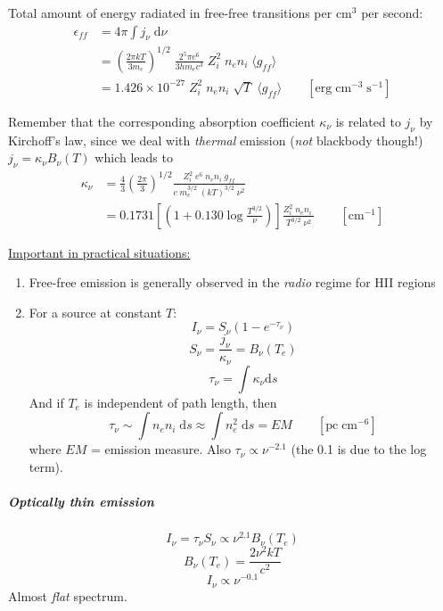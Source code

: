 \documentclass[11pt]{article}
\newcommand{\mar}[1]{\hspace{0pt}\marginpar{-\textcolor{black}{#1}-}}
\begin{document}
Total amount of energy radiated in free-free transitions per cm$^{3}$
per second:
\begin{align*}
    \epsilon_{ff} &= 4\pi \int{ j_{\nu} \;\mathrm{d}\nu }
    \\&= \left( \frac{2{\pi}kT}{3m_{e}} \right)^{1/2}\;
    \frac{2^{5} \pi e^{6}}{3hm_{e}c^{3}}\;
    Z_{i}^{2}\; n_{e}n_{i}\; \langle g_{ff} \rangle
    \\&= 1.426 \times 10^{-27}\; Z_{i}^{2}\; n_{e}n_{i}\; \sqrt{T}\;
    \langle g_{ff} \rangle
    \qquad \left[ \mathrm{erg}\; \mathrm{cm}^{-3}\; \mathrm{s}^{-1} \right]
\end{align*}

Remember that the corresponding absorption coefficient $\kappa_{\nu}$ is
related to $j_{\nu}$ by Kirchoff's law, since we deal with \emph{thermal}
emission (\emph{not} blackbody though!) $j_{\nu} = \kappa_{\nu}B_{\nu}(T)$
which leads to
\begin{align*}
    \kappa_{\nu} &= \frac{4}{3} \left( \frac{2\pi}{3} \right)^{1/2}
    \frac{ Z_{i}^{2}\; e^{6}\; n_{e}n_{i}\; g_{ff} }{ c\; m_{e}^{3/2}\; (kT)^{3/2}\; \nu^{2} }
    \\&= 0.1731 \left[ \left( 1 + 0.130 \log{\frac{T^{3/2}}{\nu}} \right) \right]
    \frac{ Z_{i}^{2}\; n_{e}n_{i}\; }{ T^{3/2}\; \nu^{2} }
    \qquad \left[ \mathrm{cm}^{-1} \right]
\end{align*}

\mar{65}\underline{Important in practical situations:}
\begin{enumerate}
    \item Free-free emission is generally observed in the \emph{radio} regime
        for HII regions
    \item For a source at constant $T$:
        \[
            I_{\nu} = S_{\nu} \left( 1 - e^{-\tau_{\nu}} \right)
            \]
        \[
            S_{\nu} = \frac{j_{\nu}}{\kappa_{\nu}} = B_{\nu} (T_{e})
            \]
        \[
            \tau_{\nu} = \int \kappa_{\nu} \mathrm{d}s
            \]
        And if $T_{e}$ is independent of path length, then
        \[
            \tau_{\nu}
            \sim \int{\! n_{e}n_{i} \;\mathrm{d}s }
            \approx \int{\! n_{e}^{2} \;\mathrm{d}s }
            = EM \qquad \left[ \mathrm{pc}\; \mathrm{cm}^{-6} \right]
            \]
        where $EM$ = emission measure.
        Also $\tau_{\nu} \propto \nu^{-2.1} $ (the 0.1 is due to the log term).
\end{enumerate}

\subparagraph{Optically thin emission}
\[
    I_{\nu} = \tau_{\nu} S_{\nu} \propto \nu^{2.1} B_{\nu}(T_{e})
    \]
\[
    B_{\nu}(T_{e}) = \frac{2\nu^{2}kT}{c^{2}}
    \]
\[
    \boxed{ I_{\nu} \propto \nu^{-0.1} }
\]
Almost \emph{flat} spectrum.
\end{document}
